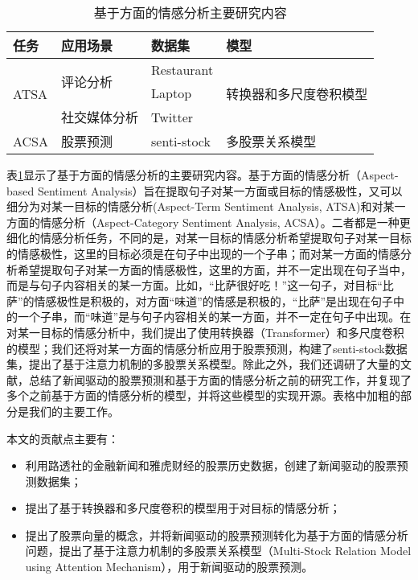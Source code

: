 \begin{table}[htb]
	\centering
	\begin{minipage}[t]{0.75\linewidth} %
		\caption[基于方面的情感分析主要研究内容]{基于方面的情感分析主要研究内容}
		\label{tab:content}
		\begin{tabularx}{\linewidth}{llll}
			\toprule[1.5pt]
			{\heiti 任务} & {\heiti 应用场景} & {\heiti 数据集} & {\heiti 模型}\\\midrule[1pt]
					\multirow{3}{*}{ATSA} & \multirow{2}{*}{评论分析} & Restaurant  & \multirow{3}{*}{转换器和多尺度卷积模型} \\ \cline{3-3}
			&                       & Laptop      &                                    \\ \cline{2-3}
			& 社交媒体分析                & Twitter     &                                    \\ \hline
			ACSA               & 股票预测                  & senti-stock & 多股票关系模型                              \\
			\bottomrule[1.5pt]
		\end{tabularx}
	\end{minipage}
\end{table}

表\ref{tab:content}显示了基于方面的情感分析的主要研究内容。基于方面的情感分析（Aspect-based Sentiment Analysis）旨在提取句子对某一方面或目标的情感极性，又可以细分为对某一目标的情感分析(Aspect-Term Sentiment Analysis, ATSA)和对某一方面的情感分析（Aspect-Category Sentiment Analysis, ACSA）。二者都是一种更细化的情感分析任务，不同的是，对某一目标的情感分析希望提取句子对某一目标的情感极性，这里的目标必须是在句子中出现的一个子串；而对某一方面的情感分析希望提取句子对某一方面的情感极性，这里的方面，并不一定出现在句子当中，而是与句子内容相关的某一方面。比如，“比萨很好吃！”这一句子，对目标“比萨”的情感极性是积极的，对方面“味道”的情感是积极的，“比萨”是出现在句子中的一个子串，而“味道”是与句子内容相关的某一方面，并不一定在句子中出现。在对某一目标的情感分析中，我们提出了使用转换器（Transformer）和多尺度卷积的模型；我们还将对某一方面的情感分析应用于股票预测，构建了senti-stock数据集，提出了基于注意力机制的多股票关系模型。除此之外，我们还调研了大量的文献，总结了新闻驱动的股票预测和基于方面的情感分析之前的研究工作，并复现了多个之前基于方面的情感分析的模型，并将这些模型的实现开源。表格中加粗的部分是我们的主要工作。

  本文的贡献点主要有：
\begin{itemize}
	\item 利用路透社的金融新闻和雅虎财经的股票历史数据，创建了新闻驱动的股票预测数据集；
	\item 提出了基于转换器和多尺度卷积的模型用于对目标的情感分析；
	\item 提出了股票向量的概念，并将新闻驱动的股票预测转化为基于方面的情感分析问题，提出了基于注意力机制的多股票关系模型（Multi-Stock Relation Model using Attention Mechanism），用于新闻驱动的股票预测。
\end{itemize}

